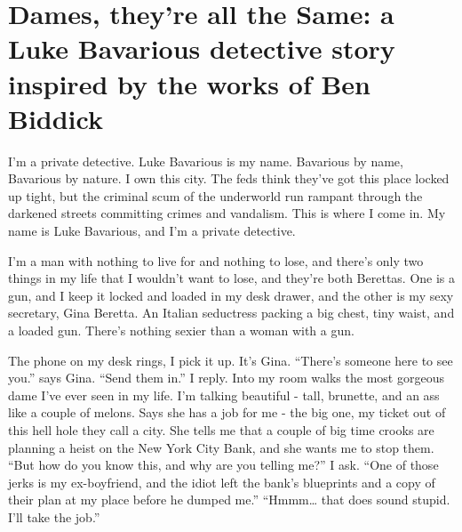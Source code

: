 \chapter[Dames, they're all the Same]{Dames, they're all the Same: a Luke Bavarious detective story inspired by the works of Ben Biddick}





I'm a private detective. Luke Bavarious is my name. Bavarious by
name, Bavarious by nature. I own this city. The feds think they've
got this place locked up tight, but the criminal scum of the
underworld run rampant through the darkened streets committing
crimes and vandalism. This is where I come in. My name is Luke
Bavarious, and I'm a private detective.



I'm a man with nothing to live for and nothing to lose, and there's
only two things in my life that I wouldn't want to lose, and
they're both Berettas. One is a gun, and I keep it locked and
loaded in my desk drawer, and the other is my sexy secretary, Gina
Beretta. An Italian seductress packing a big chest, tiny waist, and
a loaded gun. There's nothing sexier than a woman with a gun.



The phone on my desk rings, I pick it up. It's Gina. ``There's
someone here to see you.'' says Gina. ``Send them in.'' I reply. Into
my room walks the most gorgeous dame I've ever seen in my life. I'm
talking beautiful - tall, brunette, and an ass like a couple of
melons. Says she has a job for me - the big one, my ticket out of
this hell hole they call a city. She tells me that a couple of big
time crooks are planning a heist on the New York City Bank, and she
wants me to stop them. ``But how do you know this, and why are you
telling me?'' I ask. ``One of those jerks is my ex-boyfriend, and the
idiot left the bank's blueprints and a copy of their plan at my
place before he dumped me.'' ``Hmmm{\ldots} that does sound stupid. I'll
take the job.''



